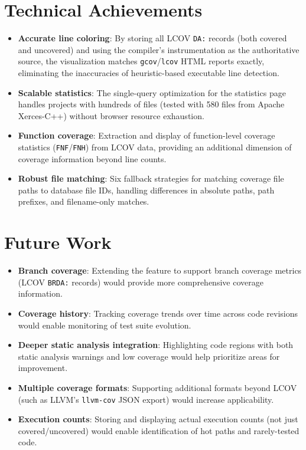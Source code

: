 \section{Technical Achievements}

\begin{itemize}
    \item \textbf{Accurate line coloring}: By storing all LCOV \texttt{DA:} records (both covered and uncovered) and using the compiler's instrumentation as the authoritative source, the visualization matches \texttt{gcov}/\texttt{lcov} HTML reports exactly, eliminating the inaccuracies of heuristic-based executable line detection.

    \item \textbf{Scalable statistics}: The single-query optimization for the statistics page handles projects with hundreds of files (tested with 580 files from Apache Xerces-C++) without browser resource exhaustion.

    \item \textbf{Function coverage}: Extraction and display of function-level coverage statistics (\texttt{FNF}/\texttt{FNH}) from LCOV data, providing an additional dimension of coverage information beyond line counts.

    \item \textbf{Robust file matching}: Six fallback strategies for matching coverage file paths to database file IDs, handling differences in absolute paths, path prefixes, and filename-only matches.
\end{itemize}

\section{Future Work}

\begin{itemize}
    \item \textbf{Branch coverage}: Extending the feature to support branch coverage metrics (LCOV \texttt{BRDA:} records) would provide more comprehensive coverage information.

    \item \textbf{Coverage history}: Tracking coverage trends over time across code revisions would enable monitoring of test suite evolution.

    \item \textbf{Deeper static analysis integration}: Highlighting code regions with both static analysis warnings and low coverage would help prioritize areas for improvement.

    \item \textbf{Multiple coverage formats}: Supporting additional formats beyond LCOV (such as LLVM's \texttt{llvm-cov} JSON export) would increase applicability.

    \item \textbf{Execution counts}: Storing and displaying actual execution counts (not just covered/uncovered) would enable identification of hot paths and rarely-tested code.
\end{itemize}

